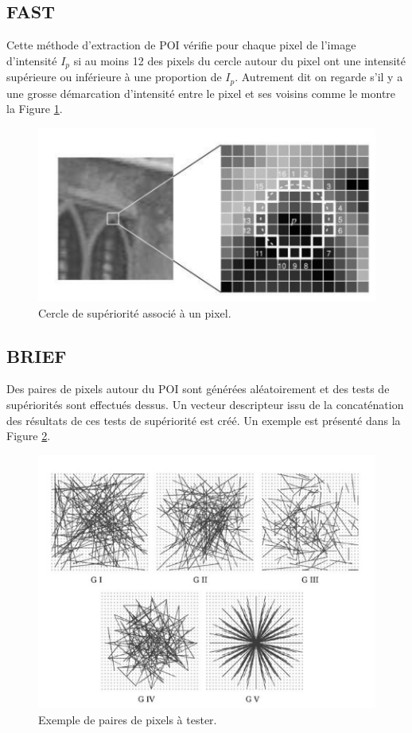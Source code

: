 \documentclass[11pt]{article}
\begin{document}
    \subsection{FAST}
      Cette méthode d'extraction de POI vérifie pour chaque pixel de l'image d'intensité $I_p$ si au moins 12 des pixels
      du cercle autour du pixel ont une intensité supérieure ou inférieure à une proportion de $I_p$. Autrement dit on regarde s’il y a une 
      grosse démarcation d'intensité entre le pixel et ses voisins comme le montre la Figure \ref{fig:CercleSuperiorite}.

      \begin{figure}[hbt]  
        \includegraphics[width=\textwidth]{CercleSuperiorite.png}    
        \caption{Cercle de supériorité associé à un pixel.}
        \label{fig:CercleSuperiorite}
      \end{figure}

    \subsection{BRIEF}
      Des paires de pixels autour du POI sont générées aléatoirement et des tests de supériorités sont effectués dessus. 
      Un vecteur descripteur issu de la concaténation des résultats de ces tests de supériorité est créé. Un exemple est présenté 
      dans la Figure \ref{fig:Paires}.

      \begin{figure}[hbt]  
        \includegraphics[width=\textwidth]{Paires.png}    
        \caption{Exemple de paires de pixels à tester.}
        \label{fig:Paires}
      \end{figure}    
\end{document}
